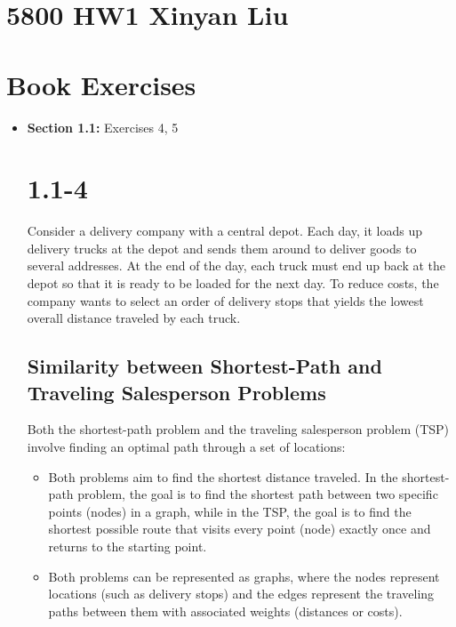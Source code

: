\documentclass{article}
\begin{document}
\section*{5800 HW1 Xinyan Liu}

\section*{Book Exercises}

\begin{itemize}
    \item \textbf{Section 1.1:} Exercises 4, 5
\section*{1.1-4}

Consider a delivery company with a central depot. Each day, it loads up delivery trucks at the depot and sends them around to deliver goods to several addresses. At the end of the day, each truck must end up back at the depot so that it is ready to be loaded for the next day. To reduce costs, the company wants to select an order of delivery stops that yields the lowest overall distance traveled by each truck.

\subsection*{Similarity between Shortest-Path and Traveling Salesperson Problems}

Both the shortest-path problem and the traveling salesperson problem (TSP) involve finding an optimal path through a set of locations:

\begin{itemize}
    \item Both problems aim to find the shortest distance traveled. In the shortest-path problem, the goal is to find the shortest path between two specific points (nodes) in a graph, while in the TSP, the goal is to find the shortest possible route that visits every point (node) exactly once and returns to the starting point.
    \item Both problems can be represented as graphs, where the nodes represent locations (such as delivery stops) and the edges represent the traveling paths between them with associated weights (distances or costs).
\end{itemize}


\end{itemize}
\end{document}
